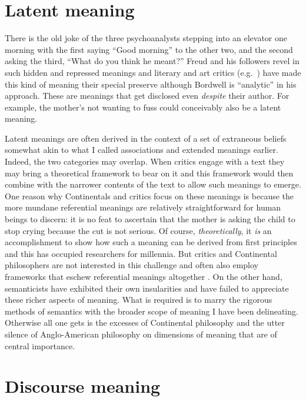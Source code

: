 \section{Latent meaning}
There is the old joke of the three psychoanalysts stepping into an elevator one morning with the first saying ``Good morning'' to the other two, and the second asking the third, ``What do you think he meant?'' Freud and his followers revel in such hidden and repressed meanings and literary and art critics (e.g.\ \citealt{barthes:m,bordwell:mm,eagleton:lt}) have made this kind of meaning their special preserve although Bordwell is ``analytic'' in his approach. These are meanings that get disclosed even \emph{despite} their author. For example, the mother's not wanting to fuss could conceivably also be a latent meaning.

Latent meanings are often derived in the context of a set of extraneous beliefs somewhat akin to what I called associations and extended meanings earlier. Indeed, the two categories may overlap. When critics engage with a text they may bring a theoretical framework to bear on it and this framework would then combine with the narrower contents of the text to allow such meanings to emerge. One reason why Continentals and critics focus on these meanings is because the more mundane referential meanings are relatively straightforward for human beings to discern: it is no feat to ascertain that the mother is asking the child to stop crying because the cut is not serious. Of course, \emph{theoretically}, it \emph{is} an accomplishment to show how such a meaning can be derived from first principles and this has occupied researchers for millennia. But critics and Continental philosophers are not interested in this challenge and often also employ frameworks that eschew referential meanings altogether \citep{eagleton:lt}. On the other hand, semanticists have exhibited their own insularities and have failed to appreciate these richer aspects of meaning. What is required is to marry the rigorous methods of semantics with the broader scope of meaning I have been delineating. Otherwise all one gets is the excesses of Continental philosophy and the utter silence of Anglo-American philosophy on dimensions of meaning that are of central importance.



\section{Discourse meaning}

